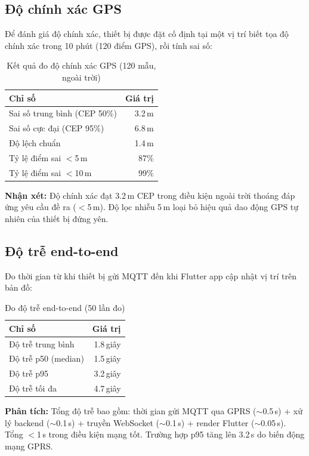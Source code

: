 \subsection{Độ chính xác GPS}

Để đánh giá độ chính xác, thiết bị được đặt cố định tại một vị trí biết tọa độ chính xác trong 10 phút (120 điểm GPS), rồi tính sai số:

\begin{table}[H]
\centering
\caption{Kết quả đo độ chính xác GPS (120 mẫu, ngoài trời)}
\label{tab:gps_accuracy}
\begin{tabular}{l r}
\toprule
\textbf{Chỉ số} & \textbf{Giá trị} \\
\midrule
Sai số trung bình (CEP 50\%) & 3.2\,m \\
Sai số cực đại (CEP 95\%) & 6.8\,m \\
Độ lệch chuẩn           & 1.4\,m \\
Tỷ lệ điểm sai $<$5\,m  & 87\% \\
Tỷ lệ điểm sai $<$10\,m & 99\% \\
\bottomrule
\end{tabular}
\end{table}

\textbf{Nhận xét:} Độ chính xác đạt 3.2\,m CEP trong điều kiện ngoài trời thoáng đáp ứng yêu cầu đề ra ($<$5\,m). Độ lọc nhiễu 5\,m loại bỏ hiệu quả dao động GPS tự nhiên của thiết bị đứng yên.

\subsection{Độ trễ end-to-end}

Đo thời gian từ khi thiết bị gửi MQTT đến khi Flutter app cập nhật vị trí trên bản đồ:

\begin{table}[H]
\centering
\caption{Đo độ trễ end-to-end (50 lần đo)}
\label{tab:latency}
\begin{tabular}{l r}
\toprule
\textbf{Chỉ số} & \textbf{Giá trị} \\
\midrule
Độ trễ trung bình & 1.8\,giây \\
Độ trễ p50 (median) & 1.5\,giây \\
Độ trễ p95 & 3.2\,giây \\
Độ trễ tối đa & 4.7\,giây \\
\bottomrule
\end{tabular}
\end{table}

\textbf{Phân tích:} Tổng độ trễ bao gồm: thời gian gửi MQTT qua GPRS ($\sim$0.5\,s) + xử lý backend ($\sim$0.1\,s) + truyền WebSocket ($\sim$0.1\,s) + render Flutter ($\sim$0.05\,s). Tổng $<$1\,s trong điều kiện mạng tốt. Trường hợp p95 tăng lên 3.2\,s do biến động mạng GPRS.

